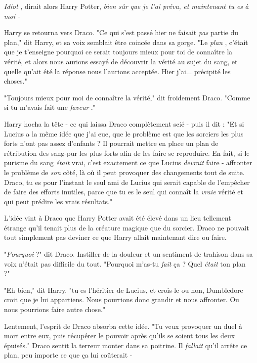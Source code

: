 \emph{Idiot} , dirait alors Harry Potter, \emph{bien sûr que je l'ai prévu, et maintenant tu es } \emph{à moi} \emph{ -} 

Harry se retourna vers Draco. "Ce qui s'est passé hier ne faisait \emph{pas}  partie du plan," dit Harry, et sa voix semblait être coincée dans sa gorge. "Le \emph{plan} , c'était que je t'enseigne pourquoi ce serait toujours mieux pour toi de connaître la vérité, et alors nous aurions essayé de découvrir la vérité au sujet du sang, et quelle qu'ait été la réponse nous l'aurions acceptée. Hier j'ai... précipité les choses."

"Toujours mieux pour moi de connaître la vérité," dit froidement Draco. "Comme si tu m'avais fait une \emph{faveur} ."

Harry hocha la tête - ce qui laissa Draco complètement scié - puis il dit : "Et si Lucius a la même idée que j'ai eue, que le problème est que les sorciers les plus forts n'ont pas assez d'enfants ? Il pourrait mettre en place un plan de rétribution des sang-pur les plus forts afin de les faire se reproduire. En fait, si le purisme du sang \emph{était } vrai, c'est exactement ce que Lucius \emph{devrait}  faire - affronter le problème de \emph{son}  côté, là où il peut provoquer des changements tout de suite. Draco, tu es pour l'instant le seul ami de Lucius qui serait capable de l'empêcher de faire des efforts inutiles, parce que tu es le seul qui connaît la \emph{vraie}  vérité et qui peut prédire les vrais résultats."

L'idée vint à Draco que Harry Potter avait été élevé dans un lieu tellement étrange qu'il tenait plus de la créature magique que du sorcier. Draco ne pouvait tout simplement pas deviner ce que Harry allait maintenant dire ou faire.

"\emph{Pourquoi}  ?" dit Draco. Instiller de la douleur et un sentiment de trahison dans sa voix n'était pas difficile du tout. "Pourquoi m'as-tu \emph{fait}  ça ? Quel \emph{était}  ton plan ?"

"Eh bien," dit Harry, "tu es l'héritier de Lucius, et crois-le ou non, Dumbledore croit que je lui appartiens. Nous pourrions donc grandir et nous affronter. Ou nous pourrions faire autre chose."

Lentement, l'esprit de Draco absorba cette idée. "Tu veux provoquer un duel à mort entre eux, puis récupérer le pouvoir après qu'ils se soient tous les deux épuisés." Draco sentit la terreur monter dans sa poitrine. Il \emph{fallait}  qu'il arrête ce plan, peu importe ce que ça lui coûterait -

